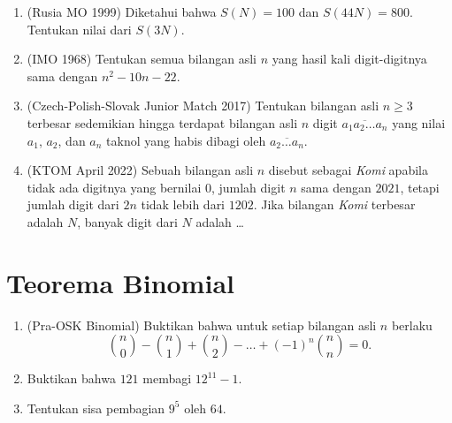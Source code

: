\documentclass[12pt]{scrartcl}
\begin{document}
\begin{enumerate}[resume]
	\item (Rusia MO 1999)
	Diketahui bahwa $S(N) = 100$ dan $S(44N) = 800$.
	Tentukan nilai dari $S(3N)$.

	\item (IMO 1968)
	Tentukan semua bilangan asli $n$ yang hasil kali digit-digitnya sama dengan $n^2 - 10n - 22$.

	\item (Czech-Polish-Slovak Junior Match 2017)
	Tentukan bilangan asli $n \ge 3$ terbesar sedemikian hingga terdapat bilangan asli $n$ digit
	$\overline{a_1a_2\dots a_n}$ yang nilai $a_1$, $a_2$, dan $a_n$ taknol
	yang habis dibagi oleh $\overline{a_2\dots a_n}$.

	\item (KTOM April 2022)
	Sebuah bilangan asli $n$ disebut sebagai \textit{Komi} apabila tidak ada digitnya
	yang bernilai $0$, jumlah digit $n$ sama dengan $2021$,
	tetapi jumlah digit dari $2n$ tidak lebih dari $1202$.
	Jika bilangan \textit{Komi} terbesar adalah $N$, banyak digit dari $N$ adalah \dots

\end{enumerate}

\section{Teorema Binomial}
\begin{enumerate}[resume]

	\item (Pra-OSK Binomial)
	Buktikan bahwa untuk setiap bilangan asli $n$ berlaku
	\[ \binom{n}{0} - \binom{n}{1} + \binom{n}{2} - \dots + (-1)^n\binom{n}{n} = 0. \]

	\item Buktikan bahwa $121$ membagi $12^{11} - 1$.

	\item Tentukan sisa pembagian $9^5$ oleh $64$.

\end{enumerate}
\end{document}
